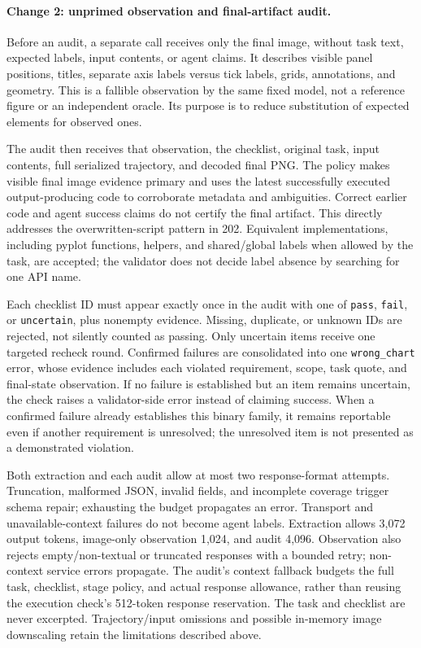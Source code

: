 \documentclass[11pt]{article}
\begin{document}
\paragraph{Change 2: unprimed observation and final-artifact audit.}
Before an audit, a separate call receives only the final image, without task
text, expected labels, input contents, or agent claims. It describes visible
panel positions, titles, separate axis labels versus tick labels, grids,
annotations, and geometry. This is a fallible observation by the same fixed
model, not a reference figure or an independent oracle. Its purpose is to
reduce substitution of expected elements for observed ones.

The audit then receives that observation, the checklist, original task, input contents, full
serialized trajectory, and decoded final PNG. The policy makes visible final
image evidence primary and uses the latest successfully executed
output-producing code to corroborate metadata and ambiguities.
Correct earlier code and agent success claims do not certify the final
artifact. This directly addresses the overwritten-script pattern in 202.
Equivalent implementations, including pyplot functions, helpers, and
shared/global labels when allowed by the task, are accepted; the validator
does not decide label absence by searching for one API name.

Each checklist ID must appear exactly once in the audit with one of
\texttt{pass}, \texttt{fail}, or \texttt{uncertain}, plus nonempty evidence.
Missing, duplicate, or unknown IDs are rejected, not silently counted as
passing. Only uncertain items receive one targeted recheck round.
Confirmed failures are consolidated into one \texttt{wrong\_chart} error,
whose evidence includes each violated requirement, scope, task quote, and
final-state observation. If no failure is established but an item remains
uncertain, the check raises a validator-side error instead of claiming success.
When a confirmed failure already establishes this binary family, it remains
reportable even if another requirement is unresolved; the unresolved item is
not presented as a demonstrated violation.

Both extraction and each audit allow at most two response-format attempts.
Truncation, malformed JSON, invalid fields, and incomplete coverage trigger
schema repair; exhausting the budget propagates an error.
Transport and unavailable-context failures do not become agent labels.
Extraction allows 3,072 output tokens, image-only observation 1,024,
and audit 4,096. Observation also rejects empty/non-textual or truncated
responses with a bounded retry; non-context service errors propagate.
The audit's context fallback budgets the full task, checklist, stage policy,
and actual response allowance, rather than reusing the execution check's
512-token response reservation. The task and checklist are never excerpted.
Trajectory/input omissions and possible in-memory image downscaling retain
the limitations described above.
\end{document}
